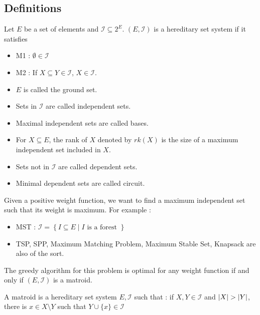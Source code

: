 \documentclass[12pt]{cours}
\begin{document}
\subsection{Definitions}
\begin{definition}
    Let $E$ be a set of elements and $\mathcal{I} \subseteq 2^{E}$. $\left(E, \mathcal{I}\right)$ is a hereditary set system if it satisfies
    \begin{itemize}
        \item M1 : $\emptyset \in \mathcal{I}$
        \item M2 : If $X \subseteq Y \in \mathcal{I}$, $X \in \mathcal{I}$.
    \end{itemize}
    \begin{itemize}
        \item $E$ is called the ground set.
        \item Sets in $\mathcal{I}$ are called independent sets.
        \item Maximal independent sets are called bases.
        \item For $X \subseteq E$, the rank of $X$ denoted by $rk(X)$ is the size of a maximum independent set included in $X$.
        \item Sets not in $\mathcal{I}$ are called dependent sets.
        \item Minimal dependent sets are called circuit.
    \end{itemize}
\end{definition}

Given a positive weight function, we want to find a maximum independent set such that its weight is maximum. For example :

\begin{itemize}
    \item MST : $\mathcal{I} = \left\{I \subseteq E \mid I \text{ is a forest } \right\}$
    \item TSP, SPP, Maximum Matching Problem, Maximum Stable Set, Knapsack are also of the sort.
\end{itemize}


\begin{theorem}
    The greedy algorithm for this problem is optimal for any weight function if and only if $\left(E, \mathcal{I}\right)$ is a matroid.
\end{theorem}

\begin{definition}
    A matroid is a hereditary set system $E, \mathcal{I}$ such that : if $X, Y \in \mathcal{I}$ and $\left|X\right| > \left|Y\right|$, there is $x \in X \setminus Y$ such that $Y \cup \{x\} \in \mathcal{I}$
\end{definition}
\end{document}
